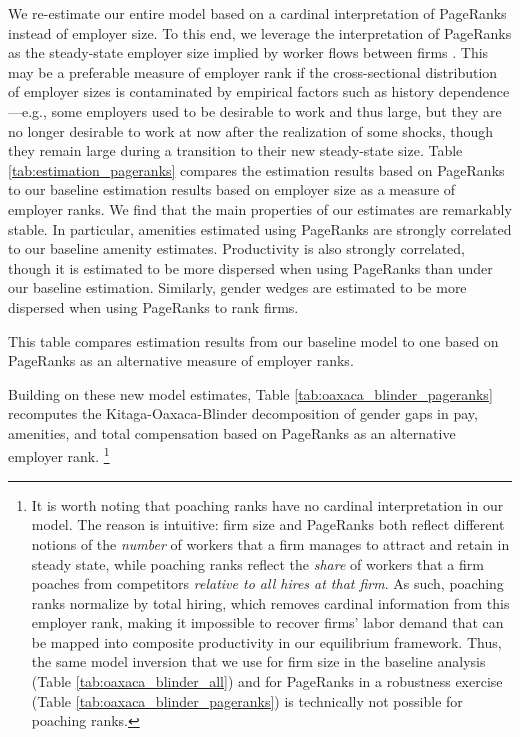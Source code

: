 We re-estimate our entire model based on a cardinal interpretation of PageRanks instead of employer size. To this end, we leverage the interpretation of PageRanks as the steady-state employer size implied by worker flows between firms \citep{PageBrinMotwaniWinograd1999}. This may be a preferable measure of employer rank if the cross-sectional distribution of employer sizes is contaminated by empirical factors such as history dependence---e.g., some employers used to be desirable to work and thus large, but they are no longer desirable to work at now after the realization of some shocks, though they remain large during a transition to their new steady-state size.
%
Table \ref{tab:estimation_pageranks} compares the estimation results based on PageRanks to our baseline estimation results based on employer size as a measure of employer ranks. We find that the main properties of our estimates are remarkably stable. In particular, amenities estimated using PageRanks are strongly correlated to our baseline amenity estimates. Productivity is also strongly correlated, though it is estimated to be more dispersed when using PageRanks than under our baseline estimation. Similarly, gender wedges are estimated to be more dispersed when using PageRanks to rank firms.
%
\begin{table}[htbp!]
    \caption{Estimation results under PageRanks as alternative measure of employer ranks}
    \label{tab:estimation_pageranks}
    \resizebox{\textwidth}{!}{%
    
    }
    \begin{tablenotes}
        \footnotesize
        This table compares estimation results from our baseline model to one based on PageRanks as an alternative measure of employer ranks. %
    \end{tablenotes}
    \begin{tablenotes}[Source]
        \sourcemodel%
    \end{tablenotes}
\end{table}
%

Building on these new model estimates, Table \ref{tab:oaxaca_blinder_pageranks} recomputes the Kitaga-Oaxaca-Blinder decomposition of gender gaps in pay, amenities, and total compensation based on PageRanks as an alternative employer rank.%
%
\footnote{\label{revision_2:editor_comment_2}It is worth noting that poaching ranks \citep{BaggerLentz2019} have no cardinal interpretation in our model. The reason is intuitive: firm size and PageRanks both reflect different notions of the \emph{number} of workers that a firm manages to attract and retain in steady state, while poaching ranks reflect the \emph{share} of workers that a firm poaches from competitors \emph{relative to all hires at that firm}. As such, poaching ranks normalize by total hiring, which removes cardinal information from this employer rank, making it impossible to recover firms' labor demand that can be mapped into composite productivity in our equilibrium framework. Thus, the same model inversion that we use for firm size in the baseline analysis (Table \ref{tab:oaxaca_blinder_all}) and for PageRanks in a robustness exercise (Table \ref{tab:oaxaca_blinder_pageranks}) is technically not possible for poaching ranks.} %
%

